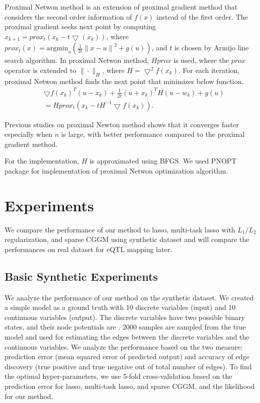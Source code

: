 \documentclass{article}
\begin{document}
Proximal Netwon method is an extension of proximal gradient method that considers the second order information of $f(x)$ instead of the first order.
The proximal gradient seeks next point by computing $x_{k+1} = prox_t (x_k - t \bigtriangledown(x_k))$, where $prox_t(x)=\text{argmin}_u(\frac{1}{2t}{\|x-u\|}^2 + g(u))$, and $t$ is chosen by Armijo line search algorithm. In proximal Netwon method, $Hprox$ is used, where the $prox$ operator is extended to $\| \cdot \|_H$, where $H=\bigtriangledown^2 f(x_k)$. For each iteration, proximal Netwon method finds the next point that minimizes below function.
\begin{align}
  &\bigtriangledown f(x_k)^T(u-x_k)+\frac{1}{2t}(u+x_k)^TH(u-w_k)+g(u) \nonumber    \\
 & =  Hprox_t(x_k-tH^{-1}\bigtriangledown f(x_k)).
\end{align}

Previous studies on proximal Newton method \cite{lee2012proximal} shows that it converges faster especially when $n$ is large, with better performance compared to the proximal gradient method.

For the implementation, $H$ is approximated using BFGS.
We used PNOPT package \cite{lee2012proximal} for implementation of proximal Netwon optimization algorithm.



\section{Experiments}
We compare the performance of our method to lasso, multi-task lasso with $L_1/L_2$ regularization, and sparse CGGM using synthetic dataset and will compare the performances on real dataset for eQTL mapping later.

\subsection{Basic Synthetic Experiments}
We analyze the performance of our method on the synthetic dataset. We created a simple model as a ground truth with 10 discrete variables (input) and 10 continuous variables (output). The discrete variables have two possible binary states, and their node potentials are . 2000 samples are sampled from the true model and used for estimating the edges between the discrete variables and the continuous variables. We analyze the performance based on the two measure: prediction error (mean squared error of predicted output) and accuracy of edge discovery (true positive and true negative out of total number of edges). To find the optimal hyper-parameters, we use 5-fold cross-validation based on the prediction error for lasso, multi-task lasso, and sparse CGGM, and the likelihood for our method.
\end{document}
